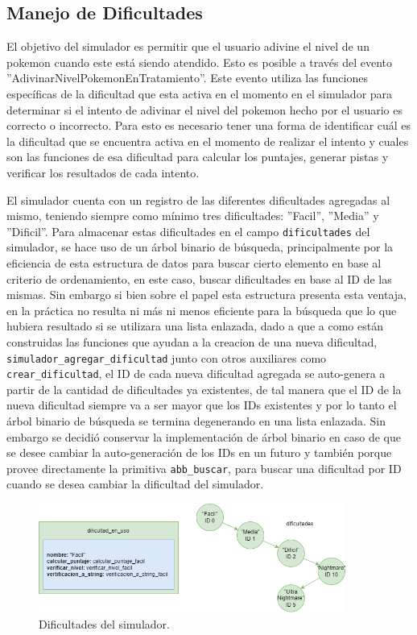 \documentclass[titlepage,a4paper]{article}
\begin{document}
\subsection{Manejo de Dificultades}

El objetivo del simulador es permitir que el usuario adivine el nivel de un
pokemon cuando este está siendo atendido. Esto es posible a través del evento
''AdivinarNivelPokemonEnTratamiento''. Este evento utiliza las funciones
específicas de la dificultad que esta activa en el momento en el simulador para
determinar si el intento de adivinar el nivel del pokemon hecho por el usuario
es correcto o incorrecto. Para esto es necesario tener una forma de identificar
cuál es la dificultad que se encuentra activa en el momento de realizar el
intento y cuales son las funciones de esa dificultad para calcular los puntajes, 
generar pistas y verificar los resultados de cada intento.

El simulador cuenta con un registro de las diferentes dificultades agregadas
al mismo, teniendo siempre como mínimo tres dificultades: ''Facil'', ''Media'' y 
''Dificil''. Para almacenar estas dificultades en el campo
\lstinline{dificultades} del simulador, se hace uso de un árbol binario de
búsqueda, principalmente por la eficiencia de esta estructura de datos para
buscar cierto elemento en base al criterio de ordenamiento, en este caso, buscar
dificultades en base al ID de las mismas. Sin embargo si bien sobre el papel
esta estructura presenta esta ventaja, en la práctica no resulta ni más ni
menos eficiente para la búsqueda que lo que hubiera resultado si se utilizara
una lista enlazada, dado a que a como están construidas las funciones que ayudan
a la creacion de una nueva dificultad, \lstinline{simulador_agregar_dificultad}
junto con otros auxiliares como \lstinline{crear_dificultad}, el ID de cada
nueva dificultad agregada se auto-genera a partir de la cantidad de dificultades
ya existentes, de tal manera que el ID de la nueva dificultad siempre va a ser
mayor que los IDs existentes y por lo tanto el árbol binario de búsqueda se 
termina degenerando en una lista enlazada. Sin embargo se decidió conservar la
implementación de árbol binario en caso de que se desee cambiar la
auto-generación de los IDs en un futuro y también porque provee directamente
la primitiva \lstinline{abb_buscar}, para buscar una dificultad por ID cuando se 
desea cambiar la dificultad del simulador.

\begin{figure}[H]
\centering
\includegraphics[width=0.9\textwidth]{img/5_dificultades.png}
\caption{\label{fig:seq05}Dificultades del simulador.}
\end{figure}
\end{document}

